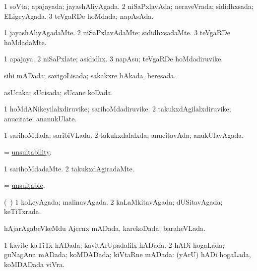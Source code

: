 \bentry
{} 
\gl{\gu}
\expl{}
\bmng
\bnum
\num{1} soVta; apajayada; jayashAliyAgada. 
\num{2} niSaPxlavAda; neraveVrada; sididhxsada; ELigeyAgada. 
\num{3} teVgaRDe hoMdada; napAsAda. 
\enum
\emng
\eentry

\bentry
{} 
\gl{\kirxvi}
\bmng
\bnum
\num{1} jayashAliyAgadaMte. 
\num{2} niSaPxlavAdaMte; sididhxsadaMte. 
\num{3} teVgaRDe hoMdadaMte. 
\enum
\emng
\eentry

\bentry
{} 
\gl{\nA}
\expl{}
\bmng
\bnum
\num{1} apajaya. 
\num{2} niSaPxlate; asididhx. 
\num{3} napAsu; teVgaRDe hoMdadiruvike. 
\enum
\emng
\eentry

\bentry
{} 
\gl{\gu}
\expl{}
\bmng
sihi mADada; savigoLisada; sakakxre hAkada, beresada. 
\emng
\eentry

\bentry
{} 
\gl{\gu}
\expl{}
\bmng
asUcaka; sUcisada; sUcane koDada. 
\emng
\eentry

\bentry
{} 
\gl{\nA}
\expl{}
\bmng
\bnum
\num{1} hoMdANikeyilalxdiruvike; sarihoMdadiruvike. 
\num{2} takukxdAgilalxdiruvike; anucitate; ananukUlate. 
\enum
\emng
\eentry

\bentry
{} 
\gl{\gu}
\expl{}
\bmng
\bnum
\num{1} sarihoMdada; saribiVLada. 
\num{2} takukxdalalxda; anucitavAda; anukUlavAgada. 
\enum
\emng
\eentry

\bentry
{} 
\gl{\nA}
\expl{}
\bmng
= \hyperlink{unsuitability}{unsuitability}. 
\emng
\eentry

\bentry
{} 
\gl{\kirxvi}
\expl{}
\bmng
\bnum
\num{1} sarihoMdadaMte. 
\num{2} takukxdAgiradaMte. 
\enum
\emng
\eentry

\bentry
{} 
\gl{\gu}
\expl{}
\bmng
= \hyperlink{unsuitable}{unsuitable}. 
\emng
\eentry

\bentry
{} 
\gl{\gu}
\expl{}
\bmng
(\kanmu\ \kAparx) 
\bnum
\num{1} koLeyAgada; malinavAgada. 
\num{2} kaLaMkitavAgada; dUSitavAgada; keTiTxrada. 
\enum
\emng
\eentry

\bentry
{} 
\gl{\gu}
\expl{}
\bmng
hAjarAgabeVkeMdu Ajecnx mADada, karekoDada; baraheVLada. 
\emng
\eentry

\bentry
{} 
\gl{\gu}
\expl{}
\bmng
\bnum
\num{1} kavite kaTiTx hADada; kavitArUpadalilx hADada. 
\num{2} hADi hogaLada; guNagAna mADada; koMDADada; kiVtaRne mADada:  (yArU) hADi hogaLada, koMDADada viVra. 
\enum
\emng
\eentry

